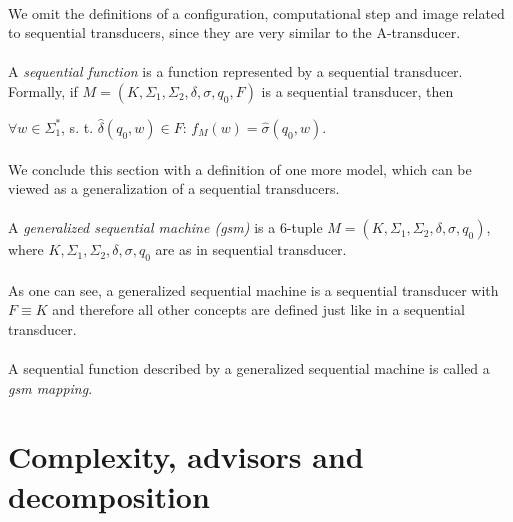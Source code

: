 \paragraph{}
We omit the definitions of a configuration, computational step and image related to sequential transducers, since they are very similar to the A-transducer.

\paragraph{}
 A \emph{sequential function} is a function represented by a sequential transducer. Formally, if $M=(K, \Sigma_{1}, \Sigma_{2}, \delta, \sigma, q_{0}, F)$ is a sequential transducer, then \\
\centerline{$\forall w \in \Sigma_{1}^{*}$, s. t. $\hat{\delta}(q_{0}, w) \in F$: $f_{M}(w) = \hat{\sigma}(q_{0}, w)$.}

\paragraph{}
We conclude this section with a definition of one more model, which can be viewed as a generalization of a sequential transducers.

\paragraph{}
 A \emph{generalized sequential machine (gsm)} is a 6-tuple $M=(K, \Sigma_{1}, \Sigma_{2}, \delta, \sigma, q_{0})$, where $K, \Sigma_{1}, \Sigma_{2}, \delta, \sigma, q_{0}$ are as in sequential transducer.

\paragraph{}
As one can see, a generalized sequential machine is a sequential transducer with $F \equiv K$ and therefore all other concepts are defined just like in a sequential transducer.

\paragraph{}
\oznacenie A sequential function described by a generalized sequential machine is called a \emph{gsm mapping}.

\section{Complexity, advisors and decomposition}

